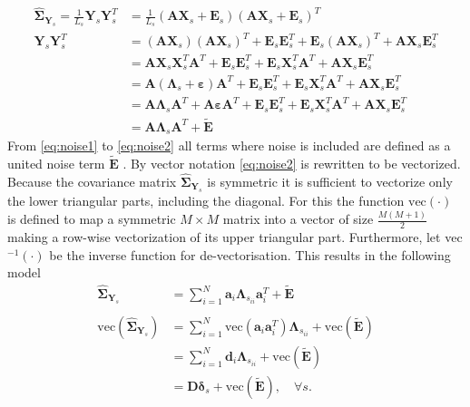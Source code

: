 \begin{align} 
\widehat{\boldsymbol{\Sigma}}_{\mathbf{Y}_s} = \frac{1}{L_s}\mathbf{Y}_s \mathbf{Y}_s^T &= \frac{1}{L_s} \left( \mathbf{A} \mathbf{X}_s + \mathbf{E}_s \right) \left( \mathbf{A} \mathbf{X}_s + \mathbf{E}_s\right)^T \nonumber \\ 
\mathbf{Y}_s \mathbf{Y}_s^T &= (\textbf{AX}_s)(\textbf{AX}_s)^T + \textbf{E}_s \textbf{E}_s^T + \textbf{E}_s (\textbf{AX}_s)^T + \textbf{AX}_s \textbf{E}_s^T \nonumber \\
&= \textbf{AX}_s \textbf{X}_s^T \textbf{A}^T + \textbf{E}_s \textbf{E}_s^T + \textbf{E}_s \textbf{X}_s^T \textbf{A}^T + \textbf{AX}_s \textbf{E}_s^T \nonumber \\
&= \textbf{A}(\boldsymbol{\Lambda}_s +\boldsymbol{\varepsilon}) \textbf{A}^T + \textbf{E}_s \textbf{E}_s^T + \textbf{E}_s \textbf{X}_s^T \textbf{A}^T + \textbf{AX}_s \textbf{E}_s^T \nonumber \\
&= \textbf{A} \boldsymbol{\Lambda}_s \textbf{A}^T + \textbf{A} \boldsymbol{\varepsilon} \textbf{A}^T + \textbf{E}_s \textbf{E}_s^T + \textbf{E}_s \textbf{X}_s^T \textbf{A}^T + \textbf{AX}_s \textbf{E}_s^T \label{eq:noise1} \\
&= \textbf{A} \boldsymbol{\Lambda}_s \textbf{A}^T + \widetilde{\textbf{E}} \label{eq:noise2}
\end{align}
From \eqref{eq:noise1} to \eqref{eq:noise2} all terms where noise is included are defined as a united noise term $\widetilde{\textbf{E}}$ . 
By vector notation \eqref{eq:noise2} is rewritten to be vectorized. 
Because the covariance matrix $\widehat{\boldsymbol{\Sigma}}_{\mathbf{Y}_s}$ is symmetric it is sufficient to vectorize only the lower triangular parts, including the diagonal. 
For this the function $\text{vec}(\cdot)$ is defined to map a symmetric $M \times M$ matrix into a vector of size $\frac{M(M+1)}{2}$ making a row-wise vectorization of its upper triangular part. 
Furthermore, let vec$^{-1}(\cdot)$ be the inverse function for de-vectorisation. 
This results in the following model        
\begin{align}
\widehat{\boldsymbol{\Sigma}}_{\mathbf{Y}_s} &= \sum_{i=1}^{N}  \textbf{a}_i \boldsymbol{\Lambda}_{s_{ii}} \textbf{a}_i^{T} + \widetilde{\textbf{E}} \nonumber \\
& \nonumber \\
\text{vec}(\widehat{\boldsymbol{\Sigma}}_{\mathbf{Y}_s}) &= \sum_{i=1}^N \text{vec}(\mathbf{a}_i \mathbf{a}_i^T) \boldsymbol{\Lambda}_{s_{ii}} + \text{vec}( \widetilde{\textbf{E}}) \nonumber \\
&= \sum_{i=1}^N \mathbf{d}_i \boldsymbol{\Lambda}_{s_{ii}} + \text{vec}( \widetilde{\textbf{E}}) \nonumber \nonumber \\
&= \mathbf{D} \boldsymbol{\delta}_s + \text{vec}( \widetilde{\textbf{E}}), \quad \forall s. \label{eq:cov1}
\end{align}
